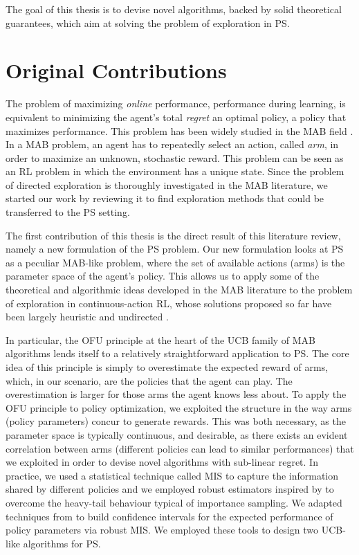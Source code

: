 The goal of this thesis is to devise novel algorithms, backed by solid theoretical guarantees, which aim at solving the problem of exploration in \gls{PS}. 

\section{Original Contributions}

The problem of maximizing \emph{online} performance, \ie performance during learning, is equivalent to minimizing the agent's total \emph{regret} \wrt an optimal policy, \ie a policy that maximizes performance. This problem has been widely studied in the \gls{MAB} field \cite{auer2002finite,lattimore2019bandit}. In a \gls{MAB} problem, an agent has to repeatedly select an action, called \textit{arm}, in order to maximize an unknown, stochastic reward. This problem can be seen as an \gls{RL} problem in which the environment has a unique state. Since the problem of directed exploration is thoroughly investigated in the \gls{MAB} literature, we started our work by reviewing it to find exploration methods that could be transferred to the \gls{PS} setting.

The first contribution of this thesis is the direct result of this literature review, namely a new formulation of the \gls{PS} problem. Our new formulation looks at \gls{PS} as a peculiar \gls{MAB}-like problem, where the set of available actions (arms) is the parameter space of the agent's policy. This allows us to apply some of the theoretical and algorithmic ideas developed in the \gls{MAB} literature to the problem of exploration in continuous-action \gls{RL}, whose solutions proposed so far have been largely heuristic and undirected \cite{houthooft2016vime,haarnoja2017reinforcement,haarnoja2018soft}. 

In particular, the \gls{OFU} principle at the heart of the \gls{UCB} \cite{lai1985asymptotically,agrawal1995sample,auer2002using} family of \gls{MAB} algorithms lends itself to a relatively straightforward application to \gls{PS}. The core idea of this principle is simply to overestimate the expected reward of arms, which, in our scenario, are the policies that the agent can play. The overestimation is larger for those arms the agent knows less about. To apply the \gls{OFU} principle to policy optimization, we exploited the structure in the way arms (policy parameters) concur to generate rewards. This was both necessary, as the parameter space is typically continuous, and desirable, as there exists an evident correlation between arms (different policies can lead to similar performances) that we exploited in order to devise novel algorithms with sub-linear regret. In practice, we used a statistical technique called \gls{MIS} \cite{veach_optimally_1995} to capture the information shared by different policies and we employed robust estimators inspired by \cite{bubeck2013bandits} to overcome the heavy-tail behaviour typical of importance sampling. We adapted techniques from \cite{metelli2018policy} to build confidence intervals for the expected performance of policy parameters via robust \gls{MIS}. We employed these tools to design two \gls{UCB}-like algorithms for \gls{PS}.

